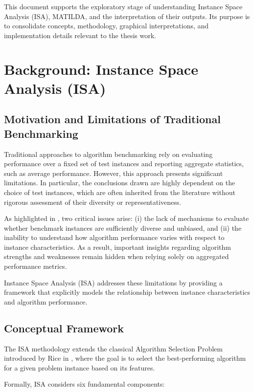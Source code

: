 \documentclass[12pt]{article}
\begin{document}
This document supports the exploratory stage of understanding Instance Space Analysis (ISA), MATILDA, and the interpretation of their outputs. Its purpose is to consolidate concepts, methodology, graphical interpretations, and implementation details relevant to the thesis work.

\section{Background: Instance Space Analysis (ISA)}

\subsection{Motivation and Limitations of Traditional Benchmarking}

Traditional approaches to algorithm benchmarking rely on evaluating performance over a fixed set of test instances and reporting aggregate statistics, such as average performance. However, this approach presents significant limitations. In particular, the conclusions drawn are highly dependent on the choice of test instances, which are often inherited from the literature without rigorous assessment of their diversity or representativeness.

As highlighted in \cite{smith-milesInstanceSpaceAnalysis2023}, two critical issues arise: (i) the lack of mechanisms to evaluate whether benchmark instances are sufficiently diverse and unbiased, and (ii) the inability to understand how algorithm performance varies with respect to instance characteristics. As a result, important insights regarding algorithm strengths and weaknesses remain hidden when relying solely on aggregated performance metrics.

Instance Space Analysis (ISA) addresses these limitations by providing a framework that explicitly models the relationship between instance characteristics and algorithm performance.

\subsection{Conceptual Framework}

The ISA methodology extends the classical Algorithm Selection Problem introduced by Rice in \cite{AlgorithmSelectionProblem1976}, where the goal is to select the best-performing algorithm for a given problem instance based on its features.

Formally, ISA considers six fundamental components:
\end{document}
